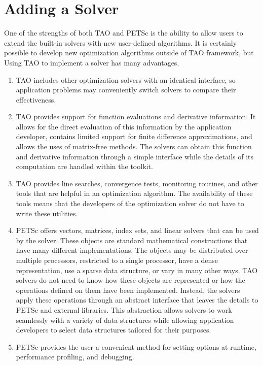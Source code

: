 
\chapter{Adding a Solver}
\label{chapter:addsolver}
One of the strengths of both TAO and PETSc is the ability to allow 
users to extend the built-in solvers with new user-defined algorithms.
It is certainly possible to develop new optimization algorithms outside of 
TAO framework, but
Using TAO to implement a solver has many advantages,

\begin{enumerate}
\item TAO includes other optimization solvers with an identical interface, 
so application problems may
conveniently switch solvers to compare their effectiveness.

\item TAO provides support for function evaluations and
derivative information.  It allows for the direct evaluation
of this information by the application developer, 
contains limited support for finite difference approximations, and
allows the uses of matrix-free methods.
The solvers can obtain this function and derivative information
through a simple interface  while the details of its computation 
are handled within the toolkit.

\item TAO provides line searches, convergence
tests, monitoring routines, and other tools
that are helpful in an optimization algorithm.
The availability
of these tools means that the developers of the optimization
solver do not have to write these utilities.

\item PETSc offers vectors, matrices, index sets, and linear solvers
that can be used by the solver.  These objects are standard mathematical
constructions that have many different implementations.
The objects may be distributed over multiple processors, restricted to
a single processor, have a dense representation, 
use a sparse data structure, or vary in many other ways.  
TAO solvers do not need to know how
these objects are represented or how the operations defined on them
have been implemented.  Instead, the solvers apply these operations
through an abstract interface that leaves the details to PETSc
and external libraries.
This abstraction allows solvers to work seamlessly with a variety
of data structures while allowing application developers to select 
data structures tailored for their purposes.

\item PETSc provides the user a convenient
method for setting options at runtime, performance profiling, and debugging.

\end{enumerate}


